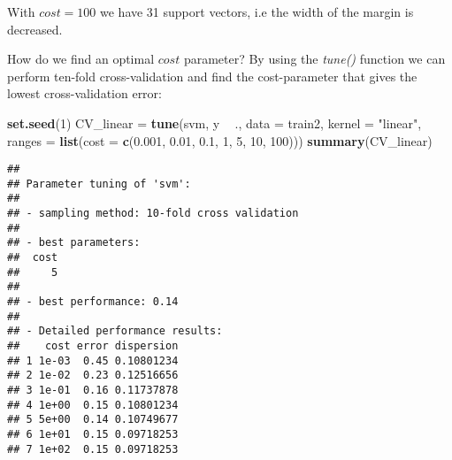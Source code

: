 \documentclass[10pt,ignorenonframetext,]{beamer}
\newenvironment{Shaded}{\begin{snugshade}}{\end{snugshade}}
\newcommand{\KeywordTok}[1]{\textcolor[rgb]{0.13,0.29,0.53}{\textbf{#1}}}
\newcommand{\DataTypeTok}[1]{\textcolor[rgb]{0.13,0.29,0.53}{#1}}
\newcommand{\DecValTok}[1]{\textcolor[rgb]{0.00,0.00,0.81}{#1}}
\newcommand{\FloatTok}[1]{\textcolor[rgb]{0.00,0.00,0.81}{#1}}
\newcommand{\StringTok}[1]{\textcolor[rgb]{0.31,0.60,0.02}{#1}}
\newcommand{\OperatorTok}[1]{\textcolor[rgb]{0.81,0.36,0.00}{\textbf{#1}}}
\newcommand{\NormalTok}[1]{#1}
\begin{document}
\begin{frame}[fragile]

With \(cost=100\) we have 31 support vectors, i.e the width of the
margin is decreased.

How do we find an optimal \(cost\) parameter? By using the \emph{tune()}
function we can perform ten-fold cross-validation and find the
cost-parameter that gives the lowest cross-validation error:

\footnotesize

\begin{Shaded}
\begin{Highlighting}[]
\KeywordTok{set.seed}\NormalTok{(}\DecValTok{1}\NormalTok{)}
\NormalTok{CV_linear =}\StringTok{ }\KeywordTok{tune}\NormalTok{(svm, y }\OperatorTok{~}\StringTok{ }\NormalTok{., }\DataTypeTok{data =}\NormalTok{ train2, }\DataTypeTok{kernel =} \StringTok{"linear"}\NormalTok{, }\DataTypeTok{ranges =} \KeywordTok{list}\NormalTok{(}\DataTypeTok{cost =} \KeywordTok{c}\NormalTok{(}\FloatTok{0.001}\NormalTok{, }
    \FloatTok{0.01}\NormalTok{, }\FloatTok{0.1}\NormalTok{, }\DecValTok{1}\NormalTok{, }\DecValTok{5}\NormalTok{, }\DecValTok{10}\NormalTok{, }\DecValTok{100}\NormalTok{)))}
\KeywordTok{summary}\NormalTok{(CV_linear)}
\end{Highlighting}
\end{Shaded}

\begin{verbatim}
## 
## Parameter tuning of 'svm':
## 
## - sampling method: 10-fold cross validation 
## 
## - best parameters:
##  cost
##     5
## 
## - best performance: 0.14 
## 
## - Detailed performance results:
##    cost error dispersion
## 1 1e-03  0.45 0.10801234
## 2 1e-02  0.23 0.12516656
## 3 1e-01  0.16 0.11737878
## 4 1e+00  0.15 0.10801234
## 5 5e+00  0.14 0.10749677
## 6 1e+01  0.15 0.09718253
## 7 1e+02  0.15 0.09718253
\end{verbatim}

\normalsize

\end{frame}
\end{document}
